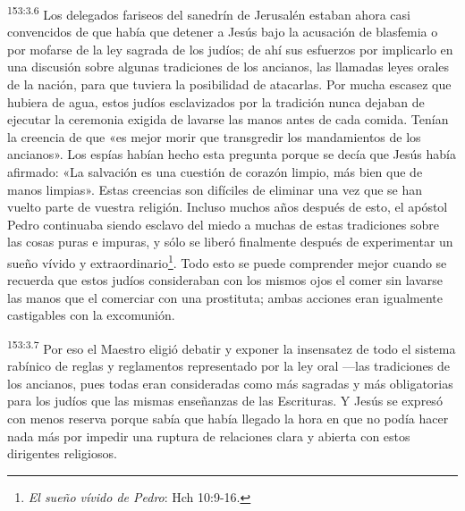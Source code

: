 \par
\textsuperscript{153:3.6} Los delegados fariseos del sanedrín de Jerusalén estaban ahora casi convencidos de que había que detener a Jesús bajo la acusación de blasfemia o por mofarse de la ley sagrada de los judíos; de ahí sus esfuerzos por implicarlo en una discusión sobre algunas tradiciones de los ancianos, las llamadas leyes orales de la nación, para que tuviera la posibilidad de atacarlas. Por mucha escasez que hubiera de agua, estos judíos esclavizados por la tradición nunca dejaban de ejecutar la ceremonia exigida de lavarse las manos antes de cada comida. Tenían la creencia de que «es mejor morir que transgredir los mandamientos de los ancianos». Los espías habían hecho esta pregunta porque se decía que Jesús había afirmado: «La salvación es una cuestión de corazón limpio, más bien que de manos limpias». Estas creencias son difíciles de eliminar una vez que se han vuelto parte de vuestra religión. Incluso muchos años después de esto, el apóstol Pedro continuaba siendo esclavo del miedo a muchas de estas tradiciones sobre las cosas puras e impuras, y sólo se liberó finalmente después de experimentar un sueño vívido y extraordinario\footnote{\textit{El sueño vívido de Pedro}: Hch 10:9-16.}. Todo esto se puede comprender mejor cuando se recuerda que estos judíos consideraban con los mismos ojos el comer sin lavarse las manos que el comerciar con una prostituta; ambas acciones eran igualmente castigables con la excomunión.

\par
\textsuperscript{153:3.7} Por eso el Maestro eligió debatir y exponer la insensatez de todo el sistema rabínico de reglas y reglamentos representado por la ley oral ---las tradiciones de los ancianos, pues todas eran consideradas como más sagradas y más obligatorias para los judíos que las mismas enseñanzas de las Escrituras. Y Jesús se expresó con menos reserva porque sabía que había llegado la hora en que no podía hacer nada más por impedir una ruptura de relaciones clara y abierta con estos dirigentes religiosos.

